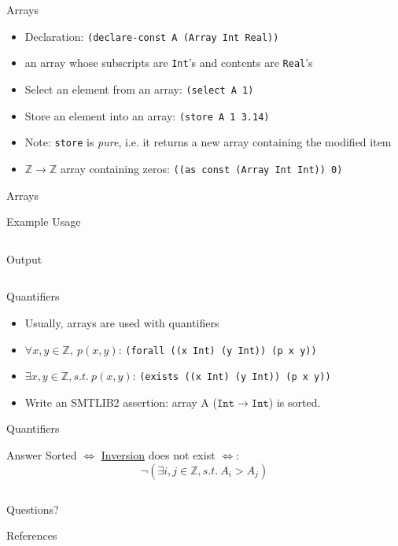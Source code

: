 \documentclass[10pt]{beamer}
\begin{document}
\begin{frame}{Arrays}
  \begin{itemize}[<+->]
    \item Declaration: \texttt{(declare-const A (Array Int Real))}
    \item an array whose subscripts are \texttt{Int}'s and contents are \texttt{Real}'s
    \item Select an element from an array: \texttt{(select A 1)}
    \item Store an element into an array: \texttt{(store A 1 3.14)}
    \item \alert{Note:} \texttt{store} is \emph{pure}, i.e. it returns a new array containing the modified item
    \item $\mathbb{Z}\to\mathbb{Z}$ array containing zeros: \texttt{((as const (Array Int Int)) 0)}
    \end{itemize}
\end{frame}

\begin{frame}[fragile]{Arrays}
  \begin{exampleblock}{Example Usage}
    \inputminted[mathescape=true]{lisp}{./src/ex7.smt2}
    \pause
    \alert{Output}
    \inputminted[mathescape=true]{lisp}{./src/ex7-out.smt2}
  \end{exampleblock}
\end{frame}

\begin{frame}{Quantifiers}
  \begin{itemize}[<+->]
    \item Usually, arrays are used with quantifiers
    \item $\forall x,y \in \mathbb{Z},\: p(x,y)$: \texttt{(forall ((x Int) (y Int)) (p x y))}
    \item $\exists x,y \in \mathbb{Z},s.t.\: p(x,y)$: \texttt{(exists ((x Int) (y Int)) (p x y))}
    \item Write an SMTLIB2 assertion: array A ($\mathtt{Int} \to \mathtt{Int}$) is sorted.
  \end{itemize}
\end{frame}

\begin{frame}[fragile]{Quantifiers}
  \begin{alertblock}{Answer}
    \vspace{4pt}
    Sorted $\Leftrightarrow$ \href{https://en.wikipedia.org/wiki/Inversion_(discrete_mathematics)}{Inversion} does not exist $\Leftrightarrow$:
    \begin{equation*}
      \neg(\exists i, j \in \mathbb{Z}, s.t.\: A_i > A_j)
    \end{equation*}
    \inputminted{lisp}{./src/ex8.smt2}
  \end{alertblock}
\end{frame}

\begin{frame}[standout]
  Questions?
\end{frame}

\begin{frame}[allowframebreaks]{References}
  
  
\end{frame}
\end{document}
